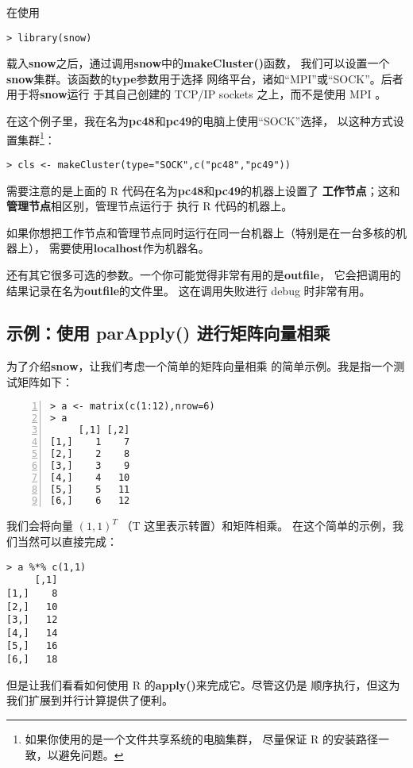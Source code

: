 在使用
\begin{lstlisting}
> library(snow)
\end{lstlisting}
载入{\bf snow}之后，通过调用{\bf snow}中的{\bf makeCluster()}函数，
我们可以设置一个{\bf snow}集群。该函数的{\bf type}参数用于选择
网络平台，诸如``MPI''或``SOCK''。后者用于将{\bf snow}运行
于其自己创建的 TCP/IP sockets 之上，而不是使用 MPI 。

在这个例子里，我在名为{\bf pc48}和{\bf pc49}的电脑上使用``SOCK''选择，
以这种方式设置集群\footnote{如果你使用的是一个文件共享系统的电脑集群，
尽量保证 R 的安装路径一致，以避免问题。}：

\begin{lstlisting}
> cls <- makeCluster(type="SOCK",c("pc48","pc49"))
\end{lstlisting}

需要注意的是上面的 R 代码在名为{\bf pc48}和{\bf pc49}的机器上设置了
{\bf 工作节点}；这和{\bf 管理节点}相区别，管理节点运行于
执行 R 代码的机器上。

如果你想把工作节点和管理节点同时运行在同一台机器上（特别是在一台多核的机器上），
需要使用{\bf localhost}作为机器名。

还有其它很多可选的参数。一个你可能觉得非常有用的是{\bf outfile}，
它会把调用的结果记录在名为{\bf outfile}的文件里。
这在调用失败进行 debug 时非常有用。

\subsection{示例：使用 parApply() 进行矩阵向量相乘}

为了介绍{\bf snow}，让我们考虑一个简单的矩阵向量相乘
的简单示例。我是指一个测试矩阵如下：

\begin{lstlisting}[numbers=left]
> a <- matrix(c(1:12),nrow=6)
> a
     [,1] [,2]
[1,]    1    7
[2,]    2    8
[3,]    3    9
[4,]    4   10
[5,]    5   11
[6,]    6   12
\end{lstlisting}

我们会将向量 $(1,1)^{T}$ （T 这里表示转置）和矩阵相乘。
在这个简单的示例，我们当然可以直接完成：

\begin{lstlisting}
> a %*% c(1,1)
     [,1]
[1,]    8
[2,]   10
[3,]   12
[4,]   14
[5,]   16
[6,]   18
\end{lstlisting}

但是让我们看看如何使用 R 的{\bf apply()}来完成它。尽管这仍是
顺序执行，但这为我们扩展到并行计算提供了便利。

